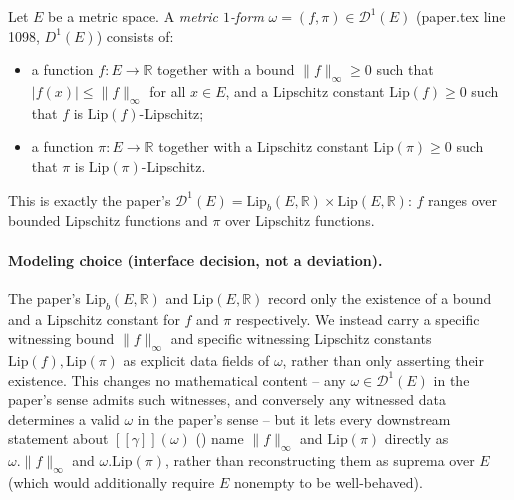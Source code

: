 \begin{definition}
  Let $E$ be a metric space. A \emph{metric $1$-form} $\omega = (f,\pi) \in \mathcal{D}^1(E)$
  (paper.tex line 1098, $D^1(E)$) consists of:
  \begin{itemize}
    \item a function $f \colon E \to \mathbb{R}$ together with a bound $\|f\|_\infty \ge 0$ such
      that $|f(x)| \le \|f\|_\infty$ for all $x \in E$, and a Lipschitz constant $\mathrm{Lip}(f) \ge 0$
      such that $f$ is $\mathrm{Lip}(f)$-Lipschitz;
    \item a function $\pi \colon E \to \mathbb{R}$ together with a Lipschitz constant
      $\mathrm{Lip}(\pi) \ge 0$ such that $\pi$ is $\mathrm{Lip}(\pi)$-Lipschitz.
  \end{itemize}
  This is exactly the paper's $\mathcal{D}^1(E) = \mathrm{Lip}_b(E,\mathbb{R}) \times \mathrm{Lip}(E,\mathbb{R})$:
  $f$ ranges over bounded Lipschitz functions and $\pi$ over Lipschitz functions.

  \paragraph{Modeling choice (interface decision, not a deviation).} The paper's
  $\mathrm{Lip}_b(E,\mathbb{R})$ and $\mathrm{Lip}(E,\mathbb{R})$ record only the existence of a
  bound and a Lipschitz constant for $f$ and $\pi$ respectively. We instead carry a specific
  witnessing bound $\|f\|_\infty$ and specific
  witnessing Lipschitz constants $\mathrm{Lip}(f), \mathrm{Lip}(\pi)$ as explicit data fields of
  $\omega$, rather than only asserting their existence. This changes no mathematical content -- any
  $\omega \in \mathcal{D}^1(E)$ in the paper's sense admits such witnesses, and conversely any
  witnessed data determines a valid $\omega$ in the paper's sense -- but it lets every downstream
  statement about $[[\gamma]](\omega)$ () name $\|f\|_\infty$ and
  $\mathrm{Lip}(\pi)$ directly as $\omega.\|f\|_\infty$ and $\omega.\mathrm{Lip}(\pi)$, rather than
  reconstructing them as suprema over $E$ (which would additionally require $E$ nonempty to be
  well-behaved).
\end{definition}
